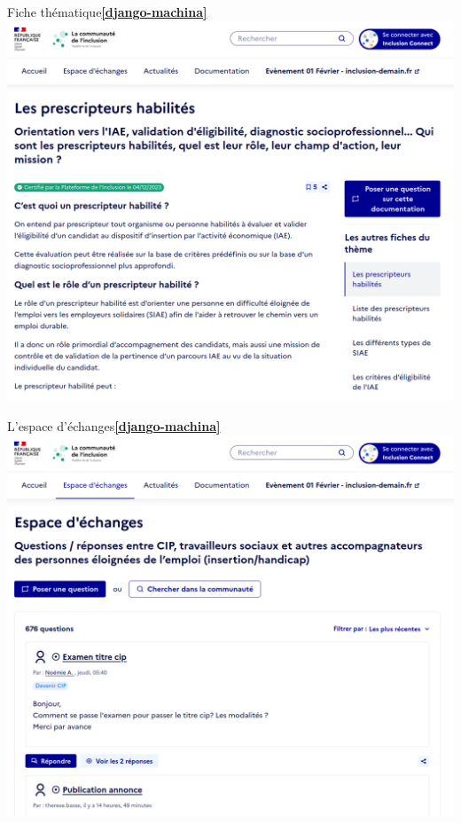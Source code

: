 \documentclass{beamer}
\begin{document}
\begin{frame}{Fiche thématique\hfill\href{https://github.com/ellmetha/django-machina/}{\textbf{[django-machina]}}}
    \includegraphics[width=\textwidth]{Images/communaute-documentation-fiche.png}
\end{frame}

\begin{frame}{L'espace d'échanges\hfill\href{https://github.com/ellmetha/django-machina/}{\textbf{[django-machina]}}}
    \includegraphics[width=\textwidth]{Images/communaute-espace-echanges.png}
\end{frame}
\end{document}
